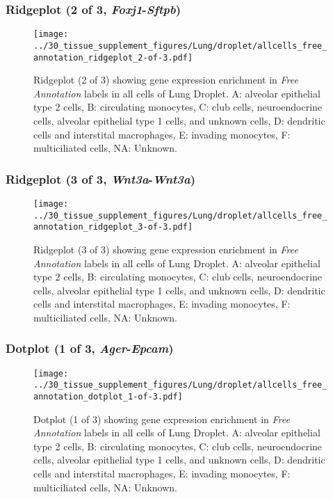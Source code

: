 \clearpage

\subsubsection{Ridgeplot (2 of 3, \emph{Foxj1}-\emph{Sftpb})}
\begin{figure}[h]
\centering
\texttt{[image: ../30\_tissue\_supplement\_figures/Lung/droplet/allcells\_free\_annotation\_ridgeplot\_2-of-3.pdf]}

\caption{ Ridgeplot (2 of 3)  showing gene expression enrichment in \emph{Free Annotation} labels in all cells of Lung Droplet. A: alveolar epithelial type 2 cells, B: circulating monocytes, C: club cells, neuroendocrine cells, alveolar epithelial type 1 cells, and unknown cells, D: dendritic cells and interstital macrophages, E: invading monocytes, F: multiciliated cells, NA: Unknown.}
\end{figure}


\clearpage

\subsubsection{Ridgeplot (3 of 3, \emph{Wnt3a}-\emph{Wnt3a})}
\begin{figure}[h]
\centering
\texttt{[image: ../30\_tissue\_supplement\_figures/Lung/droplet/allcells\_free\_annotation\_ridgeplot\_3-of-3.pdf]}

\caption{ Ridgeplot (3 of 3)  showing gene expression enrichment in \emph{Free Annotation} labels in all cells of Lung Droplet. A: alveolar epithelial type 2 cells, B: circulating monocytes, C: club cells, neuroendocrine cells, alveolar epithelial type 1 cells, and unknown cells, D: dendritic cells and interstital macrophages, E: invading monocytes, F: multiciliated cells, NA: Unknown.}
\end{figure}


\clearpage

\subsubsection{Dotplot (1 of 3, \emph{Ager}-\emph{Epcam})}
\begin{figure}[h]
\centering
\texttt{[image: ../30\_tissue\_supplement\_figures/Lung/droplet/allcells\_free\_annotation\_dotplot\_1-of-3.pdf]}

\caption{ Dotplot (1 of 3)  showing gene expression enrichment in \emph{Free Annotation} labels in all cells of Lung Droplet. A: alveolar epithelial type 2 cells, B: circulating monocytes, C: club cells, neuroendocrine cells, alveolar epithelial type 1 cells, and unknown cells, D: dendritic cells and interstital macrophages, E: invading monocytes, F: multiciliated cells, NA: Unknown.}
\end{figure}


